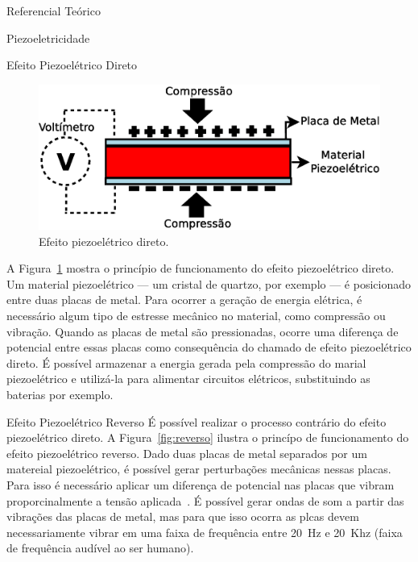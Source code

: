 \begin{chapter}{Referencial Teórico}
\begin{section}{Piezoeletricidade}
\begin{subsection}{Efeito Piezoelétrico Direto}
\begin{figure}[!h]
	\centering
	\begin{minipage}[c]{\textwidth}
	\centering
	\includegraphics[width=0.9\linewidth]{fig/EfeitoPiezoEletricoDireto}
	\caption{Efeito piezoelétrico direto.}
	\label{fig:direto}
	\end{minipage}
\end{figure}

A Figura~\ref{fig:direto} mostra o princípio de funcionamento do efeito
piezoelétrico direto. Um material piezoelétrico --- um cristal de quartzo, por
exemplo --- é posicionado entre duas placas de metal. Para ocorrer a geração de
energia elétrica, é necessário algum tipo de estresse mecânico no material, como
compressão ou vibração. Quando as placas de metal são pressionadas, ocorre uma
diferença de potencial entre essas placas como consequência do chamado de efeito
piezoelétrico direto.  É possível armazenar a energia gerada pela compressão do
marial piezoelétrico e utilizá-la para alimentar circuitos elétricos,
substituindo as baterias por exemplo. 

\end{subsection}


\begin{subsection}{Efeito Piezoelétrico Reverso}
É possível realizar o processo contrário do efeito piezoelétrico direto. A
Figura~\ref{fig:reverso} ilustra o princípo de funcionamento do efeito
piezoelétrico reverso. Dado duas placas de metal separados por um matereial
piezoelétrico, é possível gerar perturbações mecânicas nessas placas. Para isso
é necessário aplicar um diferença de potencial nas placas que vibram
proporcinalmente a tensão aplicada~\cite{Lin12}. É possível gerar ondas de som a
partir das vibrações das placas de metal, mas para que isso ocorra as plcas
devem necessariamente vibrar em uma faixa de frequência entre 20~Hz e 20~Khz
(faixa de frequência audível ao ser humano).



\end{subsection}
\end{section}
\end{chapter}
